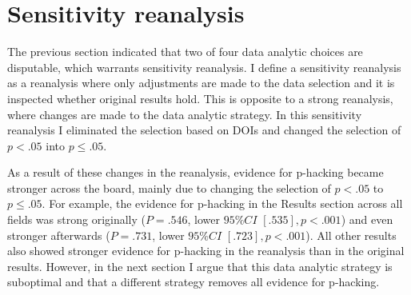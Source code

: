 \section*{Sensitivity reanalysis}
The previous section indicated that two of four data analytic choices are disputable, which warrants sensitivity reanalysis. I define a sensitivity reanalysis as a reanalysis where only adjustments are made to the data selection and it is inspected whether original results hold. This is opposite to a strong reanalysis, where changes are made to the data analytic strategy. In this sensitivity reanalysis I eliminated the selection based on DOIs and changed the selection of $p<.05$ into $p\leq.05$.

As a result of these changes in the reanalysis, evidence for p-hacking became stronger across the board, mainly due to changing the selection of $p<.05$ to $p\leq.05$. For example, the evidence for p-hacking in the Results section across all fields was strong originally ($P=.546$, lower $95\%CI$ $[.535],p<.001$) and even stronger afterwards ($P=.731$, lower $95\%CI$ $[.723],p<.001$). All other results also showed stronger evidence for p-hacking in the reanalysis than in the original results. However, in the next section I argue that this data analytic strategy is suboptimal and that a different strategy removes all evidence for p-hacking.